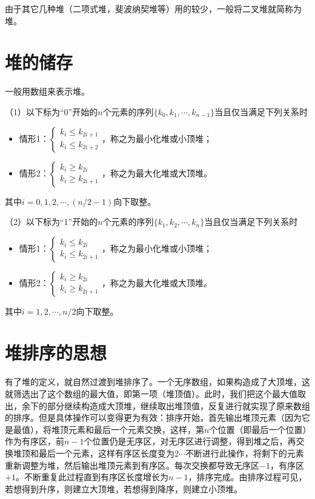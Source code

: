 由于其它几种堆（二项式堆，斐波纳契堆等）用的较少，一般将二叉堆就简称为堆。



\section{堆的储存}
一般用数组来表示堆。

（1）以下标为“0”开始的$n$个元素的序列$\{k_0,k_1,\cdots, k_{n-1}\}$当且仅当满足下列关系时
\begin{itemize}
\item 情形1：$\begin{cases}
k_i \le k_{2i+1}\\
k_i \le k_{2i+2}
\end{cases}$，称之为最小化堆或小顶堆；
\item 情形2：$\begin{cases}
k_i \ge k_{2i}\\
k_i \ge k_{2i+1}
\end{cases}$，称之为最大化堆或大顶堆。
\end{itemize}
其中$i=0,1,2,\cdots,(n/2-1)$向下取整。


（2）以下标为“1”开始的$n$个元素的序列$\{k_1,k_2,\cdots, k_n\}$当且仅当满足下列关系时
\begin{itemize}
\item 情形1：$\begin{cases}
k_i \le k_{2i}\\
k_i \le k_{2i+1}
\end{cases}$，称之为最小化堆或小顶堆；
\item 情形2：$\begin{cases}
k_i \ge k_{2i}\\
k_i \ge k_{2i+1}
\end{cases}$，称之为最大化堆或大顶堆。
\end{itemize}
其中$i=1,2,\cdots,n/2$向下取整。


\section{堆排序的思想}
有了堆的定义，就自然过渡到堆排序了。一个无序数组，如果构造成了大顶堆，这就筛选出了这个数组的最大值，即第一项（堆顶值）。此时，我们把这个最大值取出，余下的部分继续构造成大顶堆，继续取出堆顶值，反复进行就实现了原来数组的排序。但是具体操作可以变得更为有效：排序开始，首先输出堆顶元素（因为它是最值），将堆顶元素和最后一个元素交换，这样，第$n$个位置（即最后一个位置）作为有序区，前$n-1$个位置仍是无序区，对无序区进行调整，得到堆之后，再交换堆顶和最后一个元素，这样有序区长度变为$2\cdots$不断进行此操作，将剩下的元素重新调整为堆，然后输出堆顶元素到有序区。每次交换都导致无序区$-1$，有序区$+1$。不断重复此过程直到有序区长度增长为$n-1$，排序完成。由排序过程可见，若想得到升序，则建立大顶堆，若想得到降序，则建立小顶堆。

